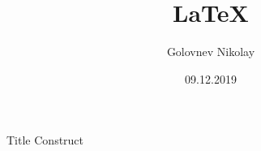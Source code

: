 \documentclass[a4paper]{article}
\title{\LaTeX}
\date{09.12.2019}
\author{Golovnev Nikolay}
\begin{document}
 {Title}
\tableofcontents
 {Construct}
\end{document}
